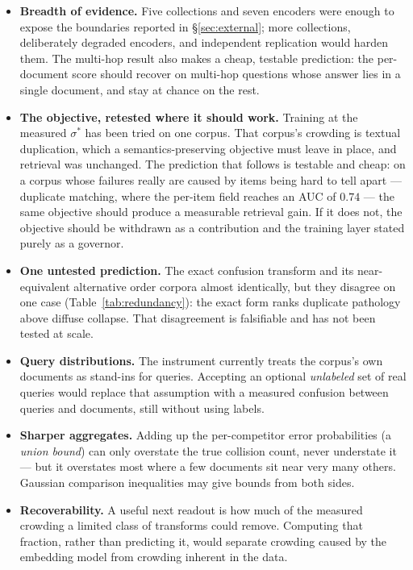 \documentclass[11pt,letterpaper]{article}
\newcommand{\sstar}{\sigma^{*}}
\begin{document}
\begin{itemize}
\item \textbf{Breadth of evidence.} Five collections and seven
  encoders were enough to expose the boundaries reported in
  \S\ref{sec:external}; more collections, deliberately degraded
  encoders, and independent replication would harden them. The multi-hop
  result also makes a cheap, testable prediction: the per-document score
  should recover on multi-hop questions whose answer lies in a single
  document, and stay at chance on the rest.
\item \textbf{The objective, retested where it should work.} Training at
  the measured $\sstar$ has been tried on one corpus. That corpus's
  crowding is textual duplication, which a semantics-preserving objective
  must leave in place, and retrieval was unchanged. The prediction that
  follows is testable and cheap: on a corpus whose failures really are
  caused by items being hard to tell apart --- duplicate matching, where
  the per-item field reaches an AUC of $0.74$ --- the same objective
  should produce a measurable retrieval gain. If it does not, the
  objective should be withdrawn as a contribution and the training layer
  stated purely as a governor.
\item \textbf{One untested prediction.} The exact confusion transform
  and its near-equivalent alternative order corpora almost identically,
  but they disagree on one case (Table~\ref{tab:redundancy}): the exact
  form ranks duplicate pathology above diffuse collapse. That
  disagreement is falsifiable and has not been tested at scale.
\item \textbf{Query distributions.} The instrument currently treats the corpus's own documents as stand-ins
  for queries. Accepting an optional \emph{unlabeled} set of real
  queries would replace that assumption with a measured confusion
  between queries and documents, still without using labels.
\item \textbf{Sharper aggregates.} Adding up the per-competitor error
  probabilities (a \emph{union bound}) can only overstate the true
  collision count, never understate it --- but it overstates most where a
  few documents sit near very many others. Gaussian comparison
  inequalities may give bounds from both sides.
\item \textbf{Recoverability.} A useful next readout is how much of the measured crowding a limited
  class of transforms could remove. Computing that fraction, rather
  than predicting it, would separate crowding caused by the embedding
  model from crowding inherent in the data.
\end{itemize}
\end{document}
